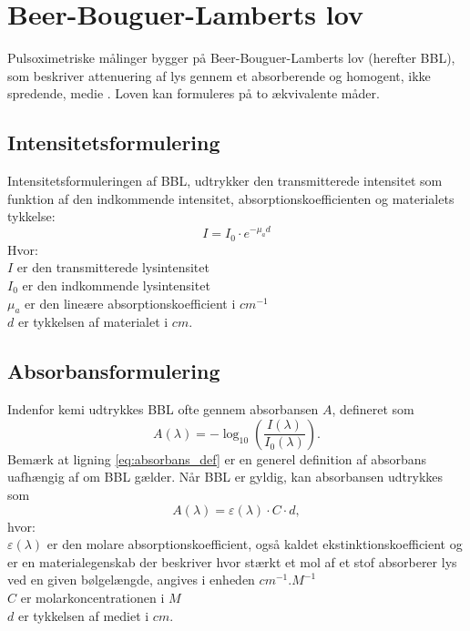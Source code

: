 \section{Beer-Bouguer-Lamberts lov}
Pulsoximetriske målinger bygger på Beer-Bouguer-Lamberts lov (herefter BBL), som beskriver attenuering af lys gennem et absorberende og homogent, ikke spredende, medie \cite{Tuchin2015,Pedrotti2017}. Loven kan formuleres på to ækvivalente måder.

\subsection{Intensitetsformulering}

Intensitetsformuleringen af BBL, udtrykker den transmitterede intensitet som funktion af den indkommende intensitet, absorptionskoefficienten og materialets tykkelse:
\begin{equation}
    I = I_0 \cdot e^{-\mu_a  d}
    \label{eq:bbl_fysik}
\end{equation}
Hvor: \\ 
$I$ er den transmitterede lysintensitet  \\
$I_0$ er den indkommende lysintensitet \\
$\mu_a$ er den lineære absorptionskoefficient i $\si{cm^{-1}}$ \\
$d$ er tykkelsen af materialet i $\si{cm}$.

\subsection{Absorbansformulering}
\label{subsec:absorbans}

Indenfor kemi udtrykkes BBL ofte gennem absorbansen $A$, 
defineret som \cite{Webster1997}
\begin{equation}
    A(\lambda) = -\log_{10}\!\left(\frac{I(\lambda)}{I_0(\lambda)}\right).
    \label{eq:absorbans_def}
\end{equation}
Bemærk at ligning \ref{eq:absorbans_def} er en generel definition af
absorbans uafhængig af om BBL gælder. Når BBL er gyldig, kan 
absorbansen udtrykkes som
\begin{equation}
    A(\lambda) = \varepsilon(\lambda) \cdot C \cdot d,
    \label{eq:bbl_absorbans}
\end{equation}
hvor: \\
$\varepsilon(\lambda)$ er den molare absorptionskoefficient, også kaldet ekstinktionskoefficient og er en materialegenskab der beskriver hvor stærkt et mol af et stof absorberer lys ved en given bølgelængde, angives i enheden $\si{cm^{-1}.M^{-1}}$ \\
$C$ er molarkoncentrationen i $\si{M}$ \\
$d$ er tykkelsen af mediet i $\si{cm}$.

